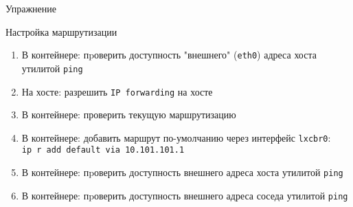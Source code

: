 \begin{frame}{Упражнение}
    \begin{block}{Настройка маршрутизации}
        \begin{enumerate}
            \item В контейнере: пpоверить доступность "внешнего" ({\tt eth0}) адреса хоста утилитой {\tt ping}
            \pause
            \item На хосте: разрешить {\tt IP forwarding} на хосте
            \item В контейнере: проверить текущую маршрутизацию
            \item В контейнере: добавить маршрут по-умолчанию через интерфейс {\tt lxcbr0}:\\
                {\tt ip r add default via 10.101.101.1}
            \item В контейнере: пpоверить доступность внешнего адреса хоста утилитой {\tt ping}
            \item В контейнере: пpоверить доступность внешнего адреса соседа утилитой {\tt ping}
        \end{enumerate}
    \end{block}
\end{frame}
